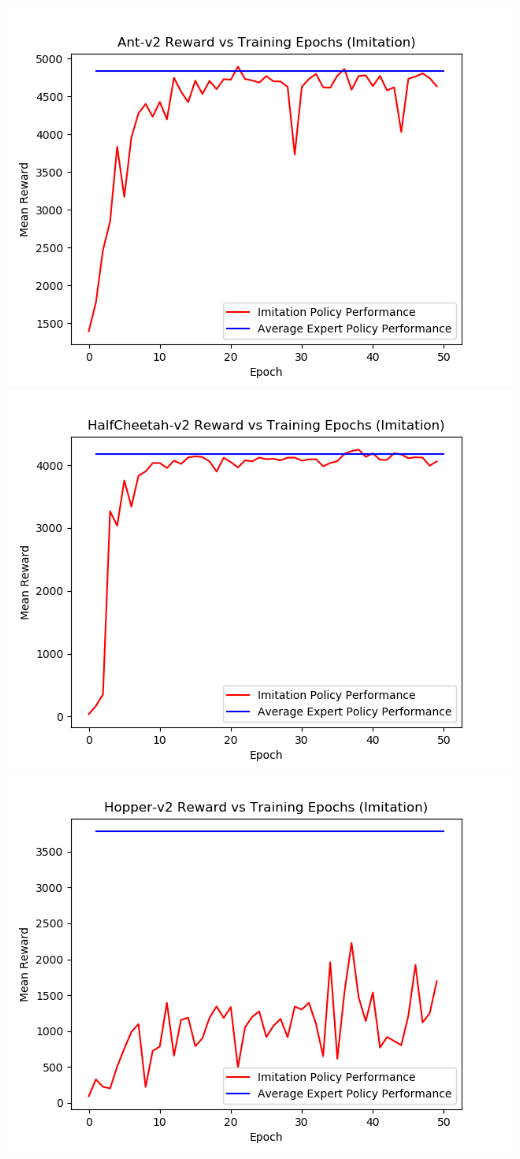 \documentclass{article}
\begin{document}
    \noindent\includegraphics[scale=0.4]{Ant-v2Imitation} 
    \includegraphics[scale=0.4]{HalfCheetah-v2Imitation}\\
    \includegraphics[scale=0.4]{Hopper-v2Imitation}
\end{document}

